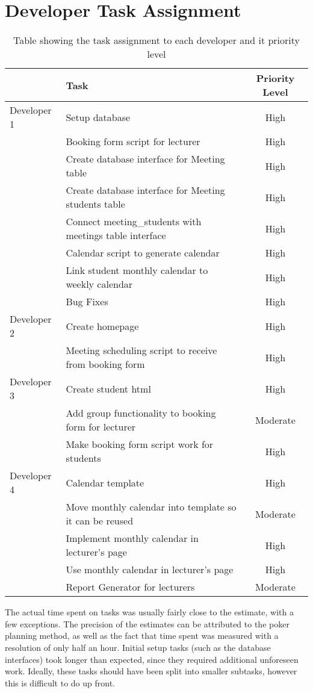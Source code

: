 \documentclass[11pt, a4paper]{article}
\begin{document}
		\section{Developer Task Assignment}
		\begin{table}[!h]
			\centering
			\caption{Table showing the task assignment to each developer and it priority level}
			\label{task_assignment}
			\begin{tabular}{| l | l | c |}
				\hline
				& Task  & Priority Level \\
				\hline \hline
				Developer 1 & Setup database & High \\
				& Booking form script for lecturer & High \\
				& Create database interface for Meeting table & High\\
				& Create database interface for Meeting students table & High \\
				& Connect meeting\_students with meetings table interface & High \\
				& Calendar script to generate calendar & High\\
				& Link student monthly calendar to weekly calendar & High \\
				& Bug Fixes & High \\
				\hline
				Developer 2 & Create homepage & High \\
				& Meeting scheduling script to receive from booking form & High \\
				\hline
				Developer 3 & Create student html & High\\
				& Add group functionality to booking form for lecturer & Moderate \\
				& Make booking form script work for students & High\\
				\hline
				Developer 4 & Calendar template & High \\
				& Move monthly calendar into template so it can be reused & Moderate\\
				& Implement monthly calendar in lecturer's page & High \\
				& Use monthly calendar in lecturer's page & High \\
				& Report Generator for lecturers & Moderate \\
				\hline
			\end{tabular}
		\end{table}
	
	The actual time spent on tasks was usually fairly close to the estimate, with a few exceptions. The precision of the estimates can be attributed to the poker planning method, as well as the fact that time spent was measured with a resolution of only half an hour. Initial setup tasks (such as the database interfaces) took longer than expected, since they required additional unforeseen work. Ideally, these tasks should have been split into smaller subtasks, however this is difficult to do up front.
	
\end{document}
